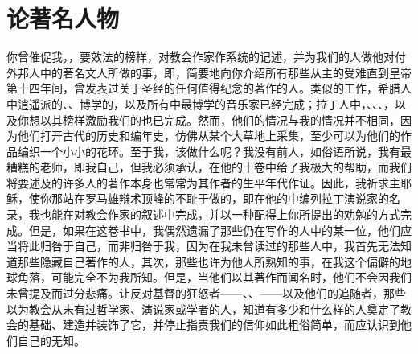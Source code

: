 
\chapter{论著名人物}


你曾催促我，，要效法的榜样，对教会作家作系统的记述，并为我们的人做他对付外邦人中的著名文人所做的事，即，简要地向你介绍所有那些从主的受难直到皇帝第十四年间，曾发表过关于圣经的任何值得纪念的著作的人。类似的工作，希腊人中逍遥派的、、博学的，以及所有中最博学的音乐家已经完成；拉丁人中，、、、，以及你想以其榜样激励我们的也已完成。然而，他们的情况与我的情况并不相同，因为他们打开古代的历史和编年史，仿佛从某个大草地上采集，至少可以为他们的作品编织一个小小的花环。至于我，该做什么呢？我没有前人，如俗语所说，我有最糟糕的老师，即我自己，但我必须承认，在他的十卷中给了我极大的帮助，而我们将要述及的许多人的著作本身也常常为其作者的生平年代作证。因此，我祈求主耶稣，使你那站在罗马雄辩术顶峰的不耻于做的，即在他的中编列拉丁演说家的名录，我也能在对教会作家的叙述中完成，并以一种配得上你所提出的劝勉的方式完成。但是，如果在这卷书中，我偶然遗漏了那些仍在写作的人中的某一位，他们应当将此归咎于自己，而非归咎于我，因为在我未曾读过的那些人中，我首先无法知道那些隐藏自己著作的人，其次，那些也许为他人所熟知的事，在我这个偏僻的地球角落，可能完全不为我所知。但是，当他们以其著作而闻名时，他们不会因我们未曾提及而过分悲痛。让反对基督的狂怒者——、、——以及他们的追随者，那些以为教会从未有过哲学家、演说家或学者的人，知道有多少和什么样的人奠定了教会的基础、建造并装饰了它，并停止指责我们的信仰如此粗俗简单，而应认识到他们自己的无知。\par


